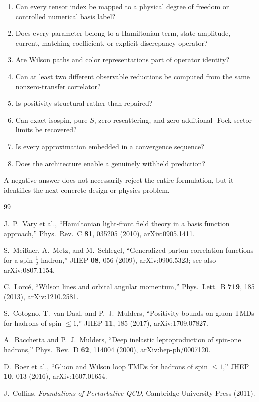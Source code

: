 \documentclass[11pt]{article}
\begin{document}
\begin{enumerate}
\item Can every tensor index be mapped to a physical degree of freedom or
controlled numerical basis label?
\item Does every parameter belong to a Hamiltonian term, state amplitude,
current, matching coefficient, or explicit discrepancy operator?
\item Are Wilson paths and color representations part of operator identity?
\item Can at least two different observable reductions be computed from the
same nonzero-transfer correlator?
\item Is positivity structural rather than repaired?
\item Can exact isospin, pure-\(S\), zero-rescattering, and zero-additional-
Fock-sector limits be recovered?
\item Is every approximation embedded in a convergence sequence?
\item Does the architecture enable a genuinely withheld prediction?
\end{enumerate}
A negative answer does not necessarily reject the entire formulation, but
it identifies the next concrete design or physics problem.

\small
\begin{thebibliography}{99}

J.~P.~Vary et al.,
``Hamiltonian light-front field theory in a basis function approach,''
Phys.\ Rev.\ C \textbf{81}, 035205 (2010),
arXiv:0905.1411.

S.~Mei{\ss}ner, A.~Metz, and M.~Schlegel,
``Generalized parton correlation functions for a spin-\(\tfrac12\)
hadron,'' JHEP \textbf{08}, 056 (2009),
arXiv:0906.5323; see also arXiv:0807.1154.

C.~Lorc\'e,
``Wilson lines and orbital angular momentum,''
Phys.\ Lett.\ B \textbf{719}, 185 (2013),
arXiv:1210.2581.

S.~Cotogno, T.~van Daal, and P.~J.~Mulders,
``Positivity bounds on gluon TMDs for hadrons of spin \(\leq1\),''
JHEP \textbf{11}, 185 (2017),
arXiv:1709.07827.

A.~Bacchetta and P.~J.~Mulders,
``Deep inelastic leptoproduction of spin-one hadrons,''
Phys.\ Rev.\ D \textbf{62}, 114004 (2000),
arXiv:hep-ph/0007120.

D.~Boer et al.,
``Gluon and Wilson loop TMDs for hadrons of spin \(\leq1\),''
JHEP \textbf{10}, 013 (2016),
arXiv:1607.01654.

J.~Collins,
\emph{Foundations of Perturbative QCD},
Cambridge University Press (2011).

\end{thebibliography}
\end{document}
